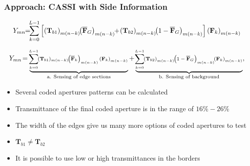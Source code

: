 \documentclass{beamer}
\begin{document}
\begin{frame}
\frametitle{Approach: CASSI with Side Information}

\vspace{-15pt}
\begin{equation*}
\small
Y_{mn} \!\! = \!\!\! \sum_{k=0}^{L-1}  \left[  \left( \mathbf{T}_{b1} \right)_{m(n-k)} \!\! \left( \mathbf{\overline{F}}_G \right)_{m(n-k)} \!\! + \!  \left( \mathbf{T}_{b2} \right)_{m(n-k)} \!\! \left(1- \mathbf{\overline{F}}_G \right)_{m(n-k)} \right]  \left( \mathbf{F}_k  \right)_{m(n-k)}
\end{equation*}


\begin{block}{}
\begin{equation*}
\begin{scriptsize}
Y_{mn} \! = \underbrace{ \! \sum_{k=0}^{L-1} \! (\mathbf{T}_{b1})_{m(n-k)} \!\! \left( \mathbf{\overline{F}}_k \right)_{m(n-k)} \left( \mathbf{F}_k  \right)_{m(n-k)}  }_{\mbox{a. Sensing of edge sections}} + \underbrace{\! \sum_{k=0}^{L-1} \!\! \left( \mathbf{T}_{b2} \right)_{m(n-k)} \!\! \left(1- \mathbf{\overline{F}}_G \right)_{m(n-k)} \!\! \left( \mathbf{F}_k  \right)_{m(n-k)}}_{\mbox{b. Sensing of background}},
\end{scriptsize}
\end{equation*}
\end{block}

\vspace{-10pt}

\begin{itemize}
\item \scriptsize{Several coded apertures patterns can be calculated}
\item \scriptsize{Transmittance of the final coded aperture is in the range of $16\% - 26\%$}
\item \scriptsize{The width of the edges give us many more options of coded apertures to test}
\item $\mathbf{T}_{b1}\neq \mathbf{T}_{b2}$
\item It is possible to use low or high transmittances in the borders
\end{itemize}

\end{frame}
\end{document}
